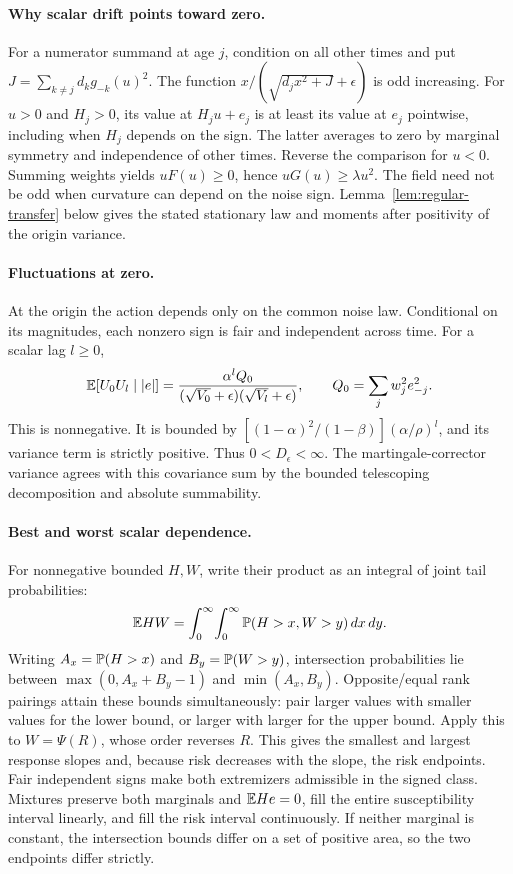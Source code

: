 \paragraph{Why scalar drift points toward zero.}
For a numerator summand at age $j$, condition on all other times and put
$J=\sum_{k\ne j}d_kg_{-k}(u)^2$. The function
$x/(\sqrt{d_jx^2+J}+\epsilon)$ is odd increasing. For $u>0$ and $H_j>0$,
its value at $H_ju+e_j$ is at least its value at $e_j$ pointwise, including
when $H_j$ depends on the sign. The latter averages to zero by marginal
symmetry and independence of other times. Reverse the comparison for $u<0$.
Summing weights yields $uF(u)\geq0$, hence
$uG(u)\geq\lambda u^2$. The field need not be odd when curvature can depend on the noise sign.
Lemma~\ref{lem:regular-transfer} below gives the stated
stationary law and moments after positivity of the origin variance.

\paragraph{Fluctuations at zero.}
At the origin the action depends only on the common noise law. Conditional
on its magnitudes, each nonzero sign is fair and independent across time.
For a scalar lag $l\geq0$,
\[
 \mathbb E[U_0U_l\mid |e|]=
 \frac{\alpha^lQ_0}{(\sqrt{V_0}+\epsilon)(\sqrt{V_l}+\epsilon)},
 \qquad Q_0=\sum_jw_j^2e_{-j}^2.
\]
This is nonnegative. It is bounded by
$[(1-\alpha)^2/(1-\beta)](\alpha/\rho)^l$, and its variance term is
strictly positive. Thus $0<D_\epsilon<\infty$. The martingale-corrector
variance agrees with this covariance sum by the bounded telescoping
decomposition and absolute summability.

\paragraph{Best and worst scalar dependence.}
For nonnegative bounded $H,W$, write their product as an integral of
joint tail probabilities:
\[
 \mathbb E HW=\int_0^\infty\!\int_0^\infty
                   \mathbb P(H>x,W>y)\,dx\,dy.
\]
Writing $A_x=\mathbb P(H>x)$ and $B_y=\mathbb P(W>y)$, intersection probabilities
lie between $\max(0,A_x+B_y-1)$ and $\min(A_x,B_y)$. Opposite/equal
rank pairings attain these bounds simultaneously: pair larger values
with smaller values for the lower bound, or larger with larger for the
upper bound. Apply this to
$W=\Psi(R)$, whose order reverses $R$. This gives the smallest and largest response slopes and, because risk
decreases with the slope, the risk endpoints.
Fair independent signs make both extremizers admissible in the signed
class. Mixtures preserve both marginals and $\mathbb E He=0$, fill the entire
susceptibility interval linearly, and fill the risk interval continuously.
If neither marginal is constant, the intersection bounds differ on a set
of positive area, so the two endpoints differ strictly.

